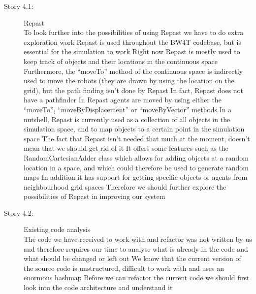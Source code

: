 \begin{description}
\item[Story 4.1:] Repast\\
To look further into the possibilities of using Repast we have to do extra exploration work
Repast is used throughout the BW4T codebase, but is essential for the simulation to work
Right now Repast is mostly used to keep track of objects and their locations in the continuous space
Furthermore, the ``moveTo'' method of the continuous space is indirectly used to move the robots (they are drawn by using the location on the grid), but the path finding isn't done by Repast
In fact, Repast does not have a pathfinder
In Repast agents are moved by using either the ``moveTo'', ``moveByDisplacement'' or ``moveByVector'' methods
In a nutshell, Repast is currently used as a collection of all objects in the simulation space, and to map objects to a certain point in the simulation space
The fact that Repast isn't needed that much at the moment, doesn't mean that we should get rid of it
It offers some features such as the RandomCartesianAdder class which allows for adding objects at a random location in a space, and which could therefore be used to generate random maps
In addition it has support for getting specific objects or agents from neighbourhood grid spaces
Therefore we should further explore the possibilities of Repast in improving our system
\end{description}

\begin{description}
\item[Story 4.2:] Existing code analysis\\
The code we have received to work with and refactor was not written by us and therefore requires our time to analyse what is already in the code and what should be changed or left out
We know that the current version of the source code is unstructured, difficult to work with and uses an enormous hashmap
Before we can refactor the current code we should first look into the code architecture and understand it
\end{description}